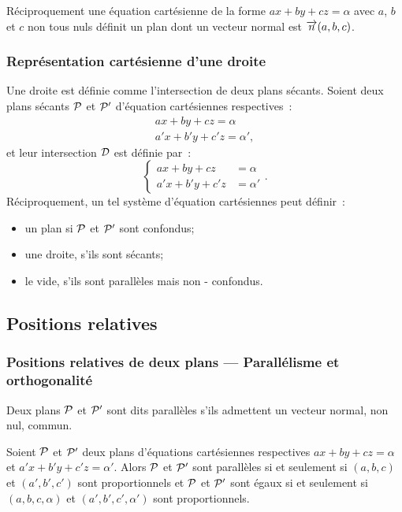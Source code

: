 Réciproquement une équation cartésienne de la forme \(ax + by + cz = \alpha\)
avec \(a\), \(b\) et \(c\) non tous nuls définit un plan dont un vecteur
normal est \(\vect{n}(a, b, c)\).

\subsubsection{Représentation cartésienne d'une droite}

Une droite est définie comme l'intersection de deux plans sécants. Soient deux
plans sécants \(\P\) et \(\P'\) d'équation cartésiennes respectives~:
\begin{align}
  ax + by + cz = \alpha \\ a'x + b'y + c'z = \alpha',
\end{align}
et leur intersection \(\Dr\) est définie par~:
\begin{equation}
  \begin{cases}
    ax + by + cz & = \alpha \\
    a'x + b'y + c'z& = \alpha'
  \end{cases}.
\end{equation}
Réciproquement, un tel système d'équation cartésiennes peut définir~:
\begin{itemize}
  \item un plan si \(\P\) et \(\P'\) sont confondus;
  \item une droite, s'ils sont sécants;
  \item le vide, s'ils sont parallèles mais non - confondus.
\end{itemize}

\subsection{Positions relatives}

\subsubsection{Positions relatives de deux plans --- Parallélisme et
orthogonalité}

\begin{defdef}
  Deux plans \(\P\) et \(\P'\) sont dits parallèles s'ils admettent un vecteur
  normal, non nul, commun.
\end{defdef}

\begin{prop}
  Soient \(\P\) et \(\P'\) deux plans d'équations cartésiennes respectives
  \(ax + by + cz = \alpha\) et \(a'x + b'y + c'z = \alpha'\). Alors \(\P\) et
  \(\P'\) sont parallèles si et seulement si \((a, b, c)\) et \((a', b', c')\)
  sont proportionnels et \(\P\) et \(\P'\) sont égaux si et seulement si \((a,
  b, c, \alpha)\) et \((a', b', c', \alpha')\) sont proportionnels.
\end{prop}

